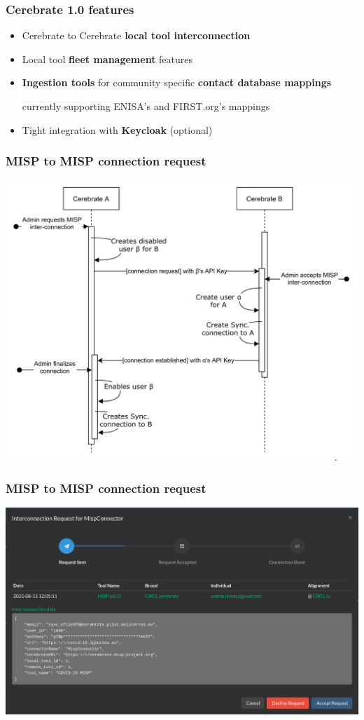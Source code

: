 \begin{frame}
	\frametitle{Cerebrate 1.0 features}
	\begin{itemize}
            \item Cerebrate to Cerebrate {\bf local tool interconnection}
            \item Local tool {\bf fleet management} features
            \item {\bf Ingestion tools} for community specific {\bf contact database mappings}
            \begin{itemize}
            currently supporting ENISA's and FIRST.org's mappings
            \end{itemize}
            \item Tight integration with {\bf Keycloak} (optional)
	\end{itemize}
\end{frame}

\begin{frame}
\frametitle{MISP to MISP connection request}
\includegraphics[scale=0.3]{connection_request.png}
\end{frame}

\begin{frame}
\frametitle{MISP to MISP connection request}
\includegraphics[scale=0.28]{connection_request2.png}
\end{frame}



